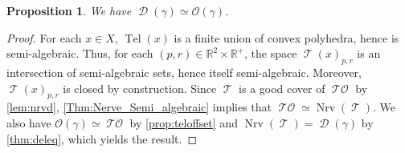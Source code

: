 \documentclass[11pt]{amsart}
\newcommand{\R}{\mathbb{R}} %
\DeclareMathOperator{\Nrv}{Nrv}
\DeclareMathOperator{\Del}{\mathcal{D}}
\DeclareMathOperator{\Tel}{Tel}
\DeclareMathOperator{\TelVor}{\mathcal{T}}
\DeclareMathOperator{\TelOffset}{\mathcal{TO}}
\newcommand{\Offset}[0]{\mathcal{O}}
\theoremstyle{plain}
\newtheorem{proposition}[theorem]{Proposition}
\theoremstyle{definition}
\theoremstyle{remark}
\begin{document}
\begin{proposition}\label{Prop:Del_Weak_Equiv} We have $\Del(\gamma)\simeq \Offset(\gamma)$.
\end{proposition}
\begin{proof}
For each $x\in X$, $\Tel(x)$ is a finite union of convex polyhedra, hence is semi-algebraic.   Thus, for each $(p,r)\in \R^2\times \R^+$, the space  $\TelVor(x)_{p,r}$ is an intersection of semi-algebraic sets, hence itself semi-algebraic.  Moreover, $\TelVor(x)_{p,r}$ is closed by construction.  Since $\TelVor$ is a good cover of $\TelOffset$  by \cref{lem:nrvd}, \cref{Thm:Nerve_Semi_algebraic} implies that $\TelOffset\simeq  \Nrv(\TelVor)$.  We also have $\mathcal O(\gamma) \simeq \TelOffset$ by \cref{prop:teloffset} and $\Nrv(\TelVor)= \Del(\gamma)$ by \cref{thm:deleq}, which yields the result.  
\end{proof}
%
%
%
\end{document}
